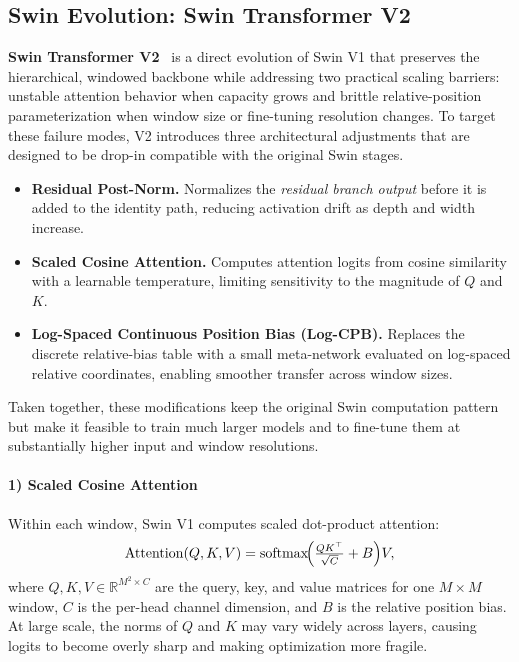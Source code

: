 \subsection{Swin Evolution: Swin Transformer V2}
\label{sec:chapter18_swin_v2}

\noindent
\textbf{Swin Transformer V2}~\cite{liu2022_swinv2} is a direct evolution of Swin V1 that preserves the
hierarchical, windowed backbone while addressing two practical scaling barriers:
unstable attention behavior when capacity grows and brittle relative-position parameterization when
window size or fine-tuning resolution changes.
To target these failure modes, V2 introduces three architectural adjustments that are designed to be
drop-in compatible with the original Swin stages.

\begin{itemize}
	\item \textbf{Residual Post-Norm.} Normalizes the \emph{residual branch output} before it is added to the identity path, reducing activation drift as depth and width increase.
	\item \textbf{Scaled Cosine Attention.} Computes attention logits from cosine similarity with a learnable temperature, limiting sensitivity to the magnitude of \(Q\) and \(K\).
	\item \textbf{Log-Spaced Continuous Position Bias (Log-CPB).} Replaces the discrete relative-bias table with a small meta-network evaluated on log-spaced relative coordinates, enabling smoother transfer across window sizes.
\end{itemize}

\noindent
Taken together, these modifications keep the original Swin computation pattern but make it feasible to
train much larger models and to fine-tune them at substantially higher input and window resolutions. 

\paragraph{1) Scaled Cosine Attention}
\noindent
Within each window, Swin V1 computes scaled dot-product attention:
\[
\operatorname{Attention}(Q,K,V)
=
\operatorname{softmax}\!\Bigl(\tfrac{QK^\top}{\sqrt{C}} + B\Bigr)V,
\]
where \(Q,K,V \in \mathbb{R}^{M^2 \times C}\) are the query, key, and value matrices for one
\(M \times M\) window, \(C\) is the per-head channel dimension, and \(B\) is the relative position bias.
At large scale, the norms of \(Q\) and \(K\) may vary widely across layers, causing logits to become
overly sharp and making optimization more fragile.

